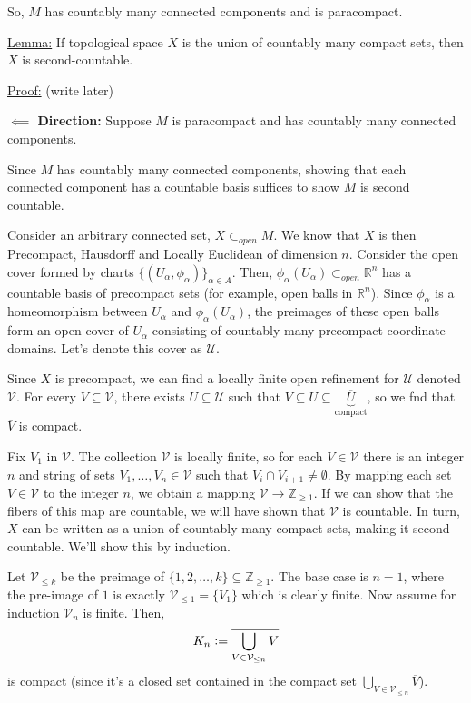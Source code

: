 \documentclass{article}
\newcommand{\R}{\mathbb{R}}
\newcommand{\defeq}{\vcentcolon=}
\begin{document}
So, $M$ has countably many connected components and is paracompact.

\vskip 1cm
\begin{dottedbox}
  \underline{Lemma:} If topological space $X$ is the union of countably many compact sets, then $X$ is second-countable.

  \vskip 0.5cm
  \underline{Proof:} (write later)
\end{dottedbox}


\vskip 1cm
\textbf{$\impliedby$ Direction:} Suppose $M$ is paracompact and has countably many connected components.

\vskip 0.25cm
Since $M$ has countably many connected components, showing that each connected component has a countable basis suffices to show $M$ is second countable.

\vskip 0.25cm
Consider an arbitrary connected set, $X \subset_{open} M$. We know that $X$ is then Precompact, Hausdorff and Locally Euclidean of dimension $n$. Consider the open cover formed by charts $\{(U_{\alpha}, \phi_{\alpha})\}_{\alpha \in A}$. Then, $\phi_{\alpha}(U_{\alpha}) \subset_{open} \R^n$ has a countable basis of precompact sets (for example, open balls in $\R^n$). Since $\phi_{\alpha}$ is a homeomorphism between $U_{\alpha}$ and $\phi_{\alpha}(U_{\alpha})$, the preimages of these open balls form an open cover of $U_{\alpha}$ consisting of countably many precompact coordinate domains. Let's denote this cover as $\mathcal{U}$.

\vskip 0.25cm
Since $X$ is precompact, we can find a locally finite open refinement for $\mathcal{U}$ denoted $\mathcal{V}$. For every $V \subseteq \mathcal{V}$, there exists $U \subseteq \mathcal{U}$ such that $V \subseteq U \subseteq \underbrace{\overline{U}}_{\text{compact}}$, so we fnd that $\overline{V}$ is compact.

\vskip 0.25cm
Fix $V_1$ in $\mathcal{V}$. The collection $\mathcal{V}$ is locally finite, so for each $V \in \mathcal{V}$ there is an integer $n$ and string of sets $V_1, \dots, V_n \in \mathcal{V}$ such that $V_i \cap V_{i+1} \neq \emptyset$. By mapping each set $V \in \mathcal{V}$ to the integer $n$, we obtain a mapping $\mathcal{V} \rightarrow \mathbb{Z}_{\geq 1}$. If we can show that the fibers of this map are countable, we will have shown that $\mathcal{V}$ is countable. In turn, $X$ can be written as a union of countably many compact sets, making it second countable. We'll show this by induction.

\vskip 0.25cm
Let $\mathcal{V}_{\leq k}$ be the preimage of $\{1, 2, \dots,  k \} \subseteq \mathbb{Z}_{\geq 1}$. The base case is $n = 1$, where the pre-image of ${1}$ is exactly $\mathcal{V}_{\leq 1} = \{V_1\}$ which is clearly finite. Now assume for induction $\mathcal{V}_n$ is finite. Then, 
\[ K_n \defeq \overline{\bigcup_{V \in \mathcal{V}_{\leq n}} V } \]
is compact (since it's a closed set contained in the compact set $\bigcup_{V \in \mathcal{V}_{\leq n}} \overline{V}$).
\end{document}
